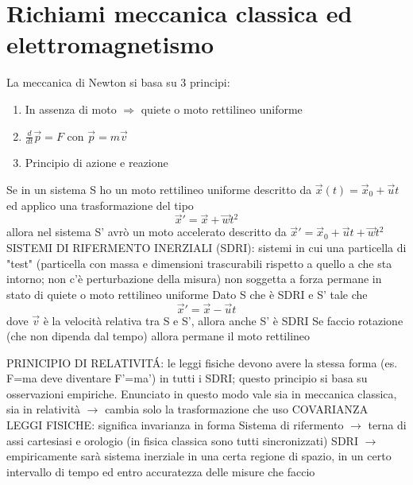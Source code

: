 \chapter{Richiami meccanica classica ed elettromagnetismo}

La meccanica di Newton si basa su 3 principi:
\begin{enumerate}
    \item In assenza di moto $\Rightarrow$ quiete o moto rettilineo uniforme
    \item $\frac{d}{dt}\vec{p} = F $ con $ \vec{p} = m\vec{v}$
    \item Principio di azione e reazione
\end{enumerate}
Se in un sistema S ho un moto rettilineo uniforme descritto da $\vec{x}(t) = \vec{x}_0 + \vec{u}t$ ed applico una trasformazione del tipo
\begin{equation*}
    \vec{x}' = \vec{x} + \vec{w}t^2
\end{equation*}
allora nel sistema S' avrò un moto accelerato descritto da $\vec{x}' = \vec{x}_0 + \vec{u}t + \vec{w}t^2$ \newline
SISTEMI DI RIFERMENTO INERZIALI (SDRI): sistemi in cui una particella di "test" (particella con massa e dimensioni trascurabili rispetto a quello a che sta intorno; non c'è perturbazione della misura) non soggetta a forza permane in stato di quiete o moto rettilineo uniforme \newline
Dato S che è SDRI e S' tale che 
\begin{equation*}
    \vec{x}' = \vec{x} - \vec{u}t
\end{equation*} 
dove $\vec{v}$ è la velocità relativa tra S e S', allora anche S' è SDRI \newline
Se faccio rotazione (che non dipenda dal tempo) allora permane il moto rettilineo \newline

\noindent PRINICIPIO DI RELATIVIT\'A: le leggi fisiche devono avere la stessa forma (es. F=ma deve diventare F'=ma') in tutti i SDRI; questo principio si basa su osservazioni empiriche. Enunciato in questo modo vale sia in meccanica classica, sia in relatività $\rightarrow$ cambia solo la trasformazione che uso \newline
COVARIANZA LEGGI FISICHE: significa invarianza in forma \newline
Sistema di rifermento $\rightarrow$ terna di assi cartesiasi e orologio (in fisica classica sono tutti sincronizzati) \newline
SDRI $ \rightarrow$ empiricamente sarà sistema inerziale in una certa regione di spazio, in un certo intervallo di tempo ed entro accuratezza delle misure che faccio

